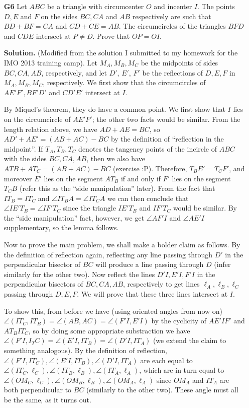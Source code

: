 \documentclass[11pt,a4paper]{article}
\begin{document}
\begin{enumerate}
	\item[\textbf{G6}] Let $ABC$ be a triangle with circumcenter $O$ and incenter $I$. The points $D,E$ and $F$ on the sides $BC,CA$ and $AB$ respectively are such that $BD+BF=CA$ and $CD+CE=AB$. The circumcircles of the triangles $BFD$ and $CDE$ intersect at $P \neq D$. Prove that $OP=OI$.
	
	\textbf{Solution.} (Modified from the solution I submitted to my homework for the IMO 2013 training camp). 
	Let $M_A, M_B, M_C$ be the midpoints of sides $BC, CA, AB$, respectively, and let $D'$, $E'$, $F'$ be the reflections of $D, E, F$ in $M_A, M_B, M_C$, respectively. 
	We first show that the circumcircles of $AE'F', BF'D'$ and $CD'E'$ intersect at $I$. 
	
	By Miquel's theorem, they do have a common point. We first show that $I$ lies on the circumcircle of $AE'F'$; the other two facts would be similar. 
	From the length relation above, we have $AD+AE=BC$, so $AD'+AE'=(AB+AC)-BC$ by the definition of ``reflection in the midpoint''. If $T_A, T_B, T_C$ denotes the tangency points of the incircle of $ABC$ with the sides $BC, CA, AB$, then we also have $ATB+AT_C=(AB+AC)-BC$ (exercise :P). 
	Therefore, $T_BE'=T_CF'$, and moreover $E'$ lies on the segment $AT_B$ if and only if $F'$ lies on the segment $T_CB$ (refer this as the ``side manipulation'' later). 
	From the fact that $IT_B=IT_C$ and $\angle IT_BA=\angle IT_CA$ we can then conclude that $\angle IE'T_B=\angle IF'T_C$ since the triangle $IE'T_B$ and $IF'T_C$ would be similar. By the ``side manipulation'' fact, however, we get $\angle AF'I$ and $\angle AE'I$ supplementary, so the lemma follows. 
	
	Now to prove the main problem, we shall make a bolder claim as follows. By the definition of reflection again, reflecting any line passing through $D'$ in the perpendicular bisector of $BC$ will produce a line passing through $D$ (infer similarly for the other two). 
	Now reflect the lines $D'I, E'I, F'I$ in the perpendicular bisectors of $BC, CA, AB$, respectively to get lines $\ell_A, \ell_B, \ell_C$ passing through $D, E, F$. We will prove that these three lines intersect at $I$. 
	
	To show this, from before we have (using oriented angles from now on) $\angle (IT_C, IT_B)=\angle (AB, AC)=\angle(F'I, E'I)$ by the cyclicity of $AE'IF'$ and $AT_BIT_C$, so by doing some appropriate substraction we have $\angle(F'I, I_TC)=\angle (E'I, IT_B)=\angle (D'I, IT_A)$ (we extend the claim to something analogous). 
	By the definition of reflection, $\angle(F'I, IT_C), \angle (E'I, IT_B), \angle (D'I, IT_A)$ are each equal to $\angle(IT_C, \ell_C), \angle (IT_B, \ell_B), \angle (IT_A, \ell_A)$, which are in turn equal to\\ $\angle(OM_C, \ell_C), \angle (OM_B, \ell_B), \angle (OM_A, \ell_A)$ since $OM_A$ and $IT_A$ are both perpendicular to $BC$ (similarly to the other two). These angle must all be the same, as it turns out. 
	

\end{enumerate}
\end{document}
